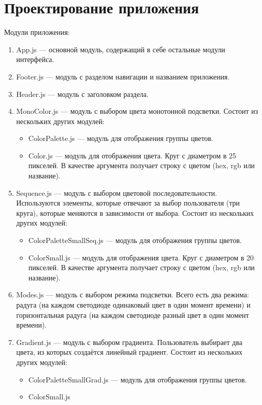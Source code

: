 \documentclass[a4paper,12pt]{article}
\begin{document}

\section{Проектирование приложения}
Модули приложения:
\begin{enumerate}
    \item App.js --- основной модуль, содержащий в себе остальные модули интерфейса.
    \item Footer.js --- модуль с разделом навигации и названием приложения.
    \item Header.js --- модуль с заголовком раздела. 
    \item MonoColor.js --- модуль с выбором цвета монотонной подсветки. Состоит из нескольких других модулей:
    \begin{itemize}
        \item ColorPalette.js --- модуль для отображения группы цветов.
        \item Color.js --- модуль для отображения цвета. Круг с диаметром в 25 пикселей. В качестве аргумента получает строку с цветом (hex, rgb или название). 
    \end{itemize}
    \item Sequence.js --- модуль с выбором цветовой последовательности. Используются элементы, которые отвечают за выбор пользователя (три круга), которые меняются в зависимости от выбора. Состоит из нескольких других модулей:
    \begin{itemize}
        \item ColorPaletteSmallSeq.js --- модуль для отображения группы цветов.
        \item ColorSmall.js --- модуль для отображения цвета. Круг с диаметром в 20 пикселей. В качестве аргумента получает строку с цветом (hex, rgb или название). 
    \end{itemize}
    \item Modes.js --- модуль с выбором режима подсветки. Всего есть два режима: радуга (на каждом светодиоде одинаковый цвет в один момент времени) и горизонтальная радуга (на каждом светодиоде разный цвет в один момент времени).
    \item Gradient.js --- модуль с выбором градиента. Пользователь выбирает два цвета, из которых создаётся линейный градиент. Состоит из нескольких других модулей:
    \begin{itemize}
        \item ColorPaletteSmallGrad.js --- модуль для отображения группы цветов.
        \item ColorSmall.js 
    \end{itemize}
\end{enumerate}
\end{document}

